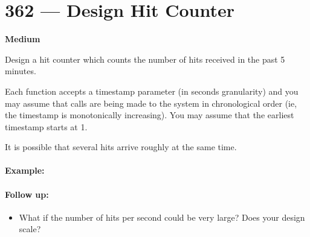 \section{362 --- Design Hit Counter}

\textbf{Medium}

Design a hit counter which counts the number of hits received in the past 5 minutes.

Each function accepts a timestamp parameter (in seconds granularity) and you may assume that calls are being made to the system in chronological order (ie, the timestamp is monotonically increasing). You may assume that the earliest timestamp starts at 1.

It is possible that several hits arrive roughly at the same time.

\paragraph{Example:}

\begin{flushleft}














\end{flushleft}

\paragraph{Follow up:}
\begin{itemize}
\item What if the number of hits per second could be very large? Does your design scale?
\end{itemize}

